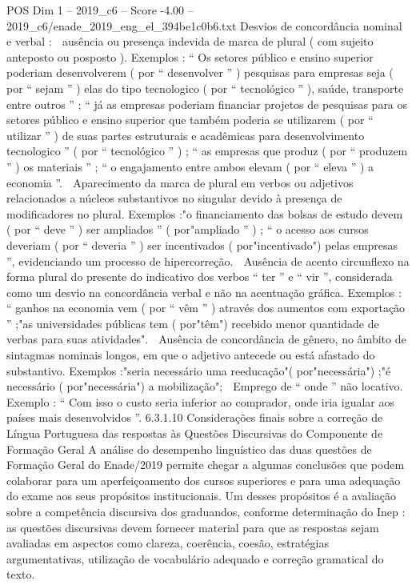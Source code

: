 \begin{textsample}{POS Dim 1 – 2019\_c6 – Score -4.00 – 2019\_c6/enade\_2019\_eng\_el\_394be1c0b6.txt}
Desvios de concordância nominal e verbal :  ausência ou presença indevida de marca de plural ( com sujeito anteposto ou posposto ).
Exemplos : “ Os setores público e ensino superior poderiam desenvolverem ( por “ desenvolver ” ) pesquisas para empresas seja ( por “ sejam ” ) elas do tipo tecnologico ( por “ tecnológico ” ), saúde, transporte entre outros ” ; “ já as empresas poderiam financiar projetos de pesquisas para os setores público e ensino superior que também poderia se utilizarem ( por “ utilizar ” ) de suas partes estruturais e acadêmicas para desenvolvimento tecnologico ” ( por “ tecnológico ” ) ; “ as empresas que produz ( por “ produzem ” ) os materiais ” ; “ o engajamento entre ambos elevam ( por “ eleva ” ) a economia ”.  Aparecimento da marca de plural em verbos ou adjetivos relacionados a núcleos substantivos no singular devido à presença de modificadores no plural.
Exemplos :"o financiamento das bolsas de estudo devem ( por “ deve ” ) ser ampliados ” ( por"ampliado ” ) ; “ o acesso aos cursos deveriam ( por “ deveria ” ) ser incentivados ( por"incentivado") pelas empresas ”, evidenciando um processo de hipercorreção.  Ausência de acento circunflexo na forma plural do presente do indicativo dos verbos “ ter ” e “ vir ”, considerada como um desvio na concordância verbal e não na acentuação gráfica.
Exemplos : “ ganhos na economia vem ( por “ vêm ” ) através dos aumentos com exportação ” ;"as universidades públicas tem ( por"têm") recebido menor quantidade de verbas para suas atividades".  Ausência de concordância de gênero, no âmbito de sintagmas nominais longos, em que o adjetivo antecede ou está afastado do substantivo.
Exemplos :"seria necessário uma reeducação"( por"necessária") ;"é necessário ( por"necessária") a mobilização";  Emprego de “ onde ” não locativo.
Exemplo : “ Com isso o custo seria inferior ao comprador, onde iria igualar aos países mais desenvolvidos ”. 6.3.1.10 Considerações finais sobre a correção de Língua Portuguesa das respostas às Questões Discursivas do Componente de Formação Geral A análise do desempenho linguístico das duas questões de Formação Geral do Enade/2019 permite chegar a algumas conclusões que podem colaborar para um aperfeiçoamento dos cursos superiores e para uma adequação do exame aos seus propósitos institucionais.
Um desses propósitos é a avaliação sobre a competência discursiva dos graduandos, conforme determinação do Inep : as questões discursivas devem fornecer material para que as respostas sejam avaliadas em aspectos como clareza, coerência, coesão, estratégias argumentativas, utilização de vocabulário adequado e correção gramatical do texto.

\end{textsample}

